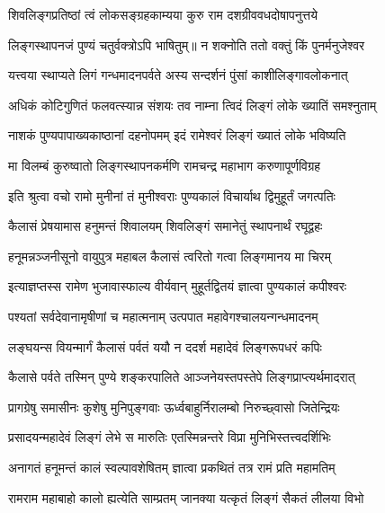 \twolineshloka
{शिवलिङ्गप्रतिष्ठां त्वं लोकसङ्ग्रहकाम्यया}
{कुरु राम दशग्रीववधदोषापनुत्तये}%


\twolineshloka
{लिङ्गस्थापनजं पुण्यं चतुर्वक्त्रोऽपि भाषितुम्॥}
{न शक्नोति ततो वक्तुं किं पुनर्मनुजेश्वर}%

\twolineshloka
{यत्त्वया स्थाप्यते लिगं गन्धमादनपर्वते}
{अस्य सन्दर्शनं पुंसां काशीलिङ्गावलोकनात्}%

\twolineshloka
{अधिकं कोटिगुणितं फलवत्स्यान्न संशयः}
{तव नाम्ना त्विदं लिङ्गं लोके ख्यातिं समश्नुताम्}%

\twolineshloka
{नाशकं पुण्यपापाख्यकाष्ठानां दहनोपमम्}
{इदं रामेश्वरं लिङ्गं ख्यातं लोके भविष्यति}%

\twolineshloka
{मा विलम्बं कुरुष्वातो लिङ्गस्थापनकर्मणि}
{रामचन्द्र महाभाग करुणापूर्णविग्रह}%


\twolineshloka
{इति श्रुत्वा वचो रामो मुनीनां तं मुनीश्वराः}
{पुण्यकालं विचार्याथ द्विमुहूर्तं जगत्पतिः}%

\twolineshloka
{कैलासं प्रेषयामास हनुमन्तं शिवालयम्}
{शिवलिङ्गं समानेतुं स्थापनार्थं रघूद्वहः}%


\twolineshloka
{हनूमन्नञ्जनीसूनो वायुपुत्र महाबल}
{कैलासं त्वरितो गत्वा लिङ्गमानय मा चिरम्}%

\twolineshloka
{इत्याज्ञप्तस्स रामेण भुजावास्फाल्य वीर्यवान्}
{मुहूर्तद्वितयं ज्ञात्वा पुण्यकालं कपीश्वरः}%

\twolineshloka
{पश्यतां सर्वदेवानामृषीणां च महात्मनाम्}
{उत्पपात महावेगश्चालयन्गन्धमादनम्}%

\twolineshloka
{लङ्घयन्स वियन्मार्गं कैलासं पर्वतं ययौ}
{न ददर्श महादेवं लिङ्गरूपधरं कपिः}%

\twolineshloka
{कैलासे पर्वते तस्मिन् पुण्ये शङ्करपालिते}
{आञ्जनेयस्तपस्तेपे लिङ्गप्राप्त्यर्थमादरात्}%

\twolineshloka
{प्रागग्रेषु समासीनः कुशेषु मुनिपुङ्गवाः}
{ऊर्ध्वबाहुर्निरालम्बो निरुच्छ्वासो जितेन्द्रियः}%

\twolineshloka
{प्रसादयन्महादेवं लिङ्गं लेभे स मारुतिः}
{एतस्मिन्नन्तरे विप्रा मुनिभिस्तत्त्वदर्शिभिः}%

\twolineshloka
{अनागतं हनूमन्तं कालं स्वल्पावशेषितम्}
{ज्ञात्वा प्रकथितं तत्र रामं प्रति महामतिम्}%

\twolineshloka
{रामराम महाबाहो कालो ह्यत्येति साम्प्रतम्}
{जानक्या यत्कृतं लिङ्गं सैकतं लीलया विभो}%

